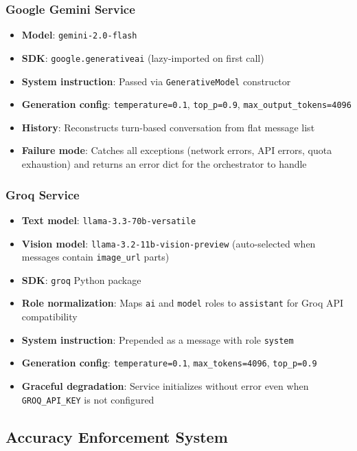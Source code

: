 \documentclass[11pt,a4paper]{article}
\begin{document}
\subsubsection{Google Gemini Service}

\begin{itemize}
    \item \textbf{Model}: \texttt{gemini-2.0-flash}
    \item \textbf{SDK}: \texttt{google.generativeai} (lazy-imported on first call)
    \item \textbf{System instruction}: Passed via \texttt{GenerativeModel} constructor
    \item \textbf{Generation config}: \texttt{temperature=0.1}, \texttt{top\_p=0.9}, \texttt{max\_output\_tokens=4096}
    \item \textbf{History}: Reconstructs turn-based conversation from flat message list
    \item \textbf{Failure mode}: Catches all exceptions (network errors, API errors, quota exhaustion) and returns an error dict for the orchestrator to handle
\end{itemize}

\subsubsection{Groq Service}

\begin{itemize}
    \item \textbf{Text model}: \texttt{llama-3.3-70b-versatile}
    \item \textbf{Vision model}: \texttt{llama-3.2-11b-vision-preview} (auto-selected when messages contain \texttt{image\_url} parts)
    \item \textbf{SDK}: \texttt{groq} Python package
    \item \textbf{Role normalization}: Maps \texttt{ai} and \texttt{model} roles to \texttt{assistant} for Groq API compatibility
    \item \textbf{System instruction}: Prepended as a message with role \texttt{system}
    \item \textbf{Generation config}: \texttt{temperature=0.1}, \texttt{max\_tokens=4096}, \texttt{top\_p=0.9}
    \item \textbf{Graceful degradation}: Service initializes without error even when \texttt{GROQ\_API\_KEY} is not configured
\end{itemize}

\subsection{Accuracy Enforcement System}
\end{document}
